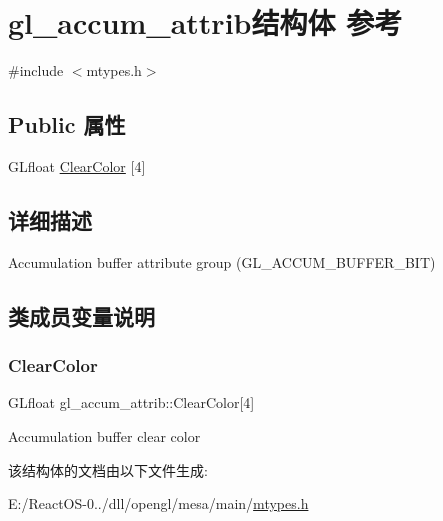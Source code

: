 \hypertarget{structgl__accum__attrib}{}\section{gl\+\_\+accum\+\_\+attrib结构体 参考}
\label{structgl__accum__attrib}


{\ttfamily \#include $<$mtypes.\+h$>$}

\subsection*{Public 属性}
\begin{DoxyCompactItemize}
\item 
G\+Lfloat \hyperlink{structgl__accum__attrib_a43ed5ba25c5b5d08a3b0b19faff01956}{Clear\+Color} \mbox{[}4\mbox{]}
\end{DoxyCompactItemize}


\subsection{详细描述}
Accumulation buffer attribute group (G\+L\+\_\+\+A\+C\+C\+U\+M\+\_\+\+B\+U\+F\+F\+E\+R\+\_\+\+B\+IT) 

\subsection{类成员变量说明}
\mbox{\label{structgl__accum__attrib_a43ed5ba25c5b5d08a3b0b19faff01956}} 
\subsubsection{\texorpdfstring{Clear\+Color}{ClearColor}}
{\footnotesize\ttfamily G\+Lfloat gl\+\_\+accum\+\_\+attrib\+::\+Clear\+Color\mbox{[}4\mbox{]}}

Accumulation buffer clear color 

该结构体的文档由以下文件生成\+:\begin{DoxyCompactItemize}
\item 
E\+:/\+React\+O\+S-\/0../dll/opengl/mesa/main/\hyperlink{mtypes_8h}{mtypes.\+h}\end{DoxyCompactItemize}
